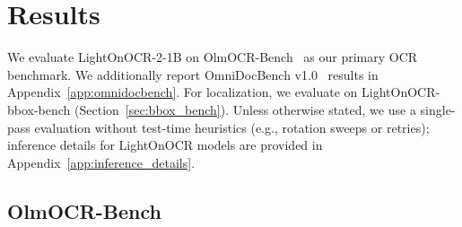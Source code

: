\documentclass{article}
\begin{document}
\section{Results}
\label{sec:results}

We evaluate LightOnOCR-2-1B on OlmOCR-Bench~\cite{poznanski2025olmocr} as our primary OCR benchmark. We additionally report OmniDocBench v1.0~\cite{omnidocbench} results in Appendix~\ref{app:omnidocbench}. For localization, we evaluate on LightOnOCR-bbox-bench (Section~\ref{sec:bbox_bench}). Unless otherwise stated, we use a single-pass evaluation without test-time heuristics (e.g., rotation sweeps or retries); inference details for LightOnOCR models are provided in Appendix~\ref{app:inference_details}.


\subsection{OlmOCR-Bench}
\end{document}
